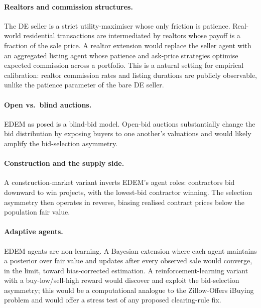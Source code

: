 \documentclass{article}
\begin{document}
\paragraph{Realtors and commission structures.} The DE seller is a
strict utility-maximiser whose only friction is patience. Real-world
residential transactions are intermediated by realtors whose payoff
is a fraction of the sale price. A realtor extension would replace
the seller agent with an aggregated listing agent whose patience
and ask-price strategies optimise expected commission across a
portfolio. This is a natural setting for empirical calibration:
realtor commission rates and listing durations are publicly
observable, unlike the patience parameter of the bare DE seller.

\paragraph{Open vs.\ blind auctions.} EDEM as posed is a blind-bid
model. Open-bid auctions substantially change the bid distribution
by exposing buyers to one another's valuations and would likely
amplify the bid-selection asymmetry.

\paragraph{Construction and the supply side.} A construction-market
variant inverts EDEM's agent roles: contractors bid downward to
win projects, with the lowest-bid contractor winning. The selection
asymmetry then operates in reverse, biasing realised contract
prices below the population fair value.

\paragraph{Adaptive agents.} EDEM agents are non-learning. A
Bayesian extension where each agent maintains a posterior over
fair value and updates after every observed sale would converge,
in the limit, toward bias-corrected estimation. A
reinforcement-learning variant with a buy-low/sell-high reward
would discover and exploit the bid-selection asymmetry; this would
be a computational analogue to the Zillow-Offers iBuying problem
\citep{zillow2021ibuying} and would offer a stress test of any
proposed clearing-rule fix.


\end{document}
